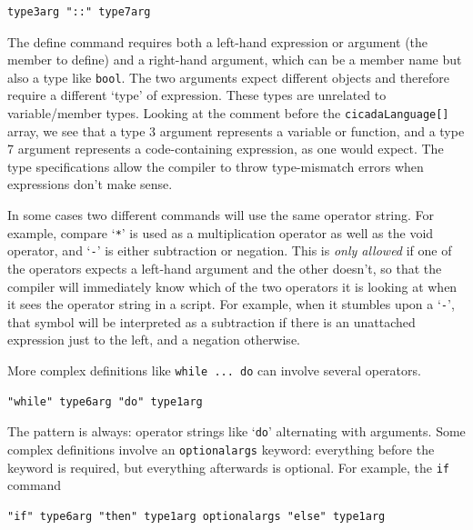 \documentclass{article}
\newenvironment{code}{
       \begin{list}{}{
               \setlength{\leftmargin}{.4in}
               \setlength{\rightmargin}{0in}
               \setlength{\topsep}{.2in}
       }
       \small
       \item[] }
       { \end{list}   }
\begin{document}
\begin{code} \begin{verbatim}
type3arg "::" type7arg
\end{verbatim} \end{code}

\noindent The define command requires both a left-hand expression or argument (the member to define) and a right-hand argument, which can be a member name but also a type like \verb#bool#.  The two arguments expect different objects and therefore require a different `type' of expression.  These types are unrelated to variable/member types.  Looking at the comment before the \verb#cicadaLanguage[]# array, we see that a type 3 argument represents a variable or function, and a type 7 argument represents a code-containing expression, as one would expect.  The type specifications allow the compiler to throw type-mismatch errors when expressions don't make sense.

In some cases two different commands will use the same operator string.  For example, compare `\verb#*#' is used as a multiplication operator as well as the void operator, and `\verb#-#' is either subtraction or negation.  This is \emph{only allowed} if one of the operators expects a left-hand argument and the other doesn't, so that the compiler will immediately know which of the two operators it is looking at when it sees the operator string in a script.  For example, when it stumbles upon a `\verb#-#', that symbol will be interpreted as a subtraction if there is an unattached expression just to the left, and a negation otherwise.

More complex definitions like \verb#while ... do# can involve several operators.

\begin{code} \begin{verbatim}
"while" type6arg "do" type1arg
\end{verbatim} \end{code}

\noindent The pattern is always:  operator strings like `\verb#do#' alternating with arguments.  Some complex definitions involve an \verb#optionalargs# keyword:  everything before the keyword is required, but everything afterwards is optional.  For example, the \verb#if# command

\begin{code} \begin{verbatim}
"if" type6arg "then" type1arg optionalargs "else" type1arg
\end{verbatim} \end{code}
\end{document}
